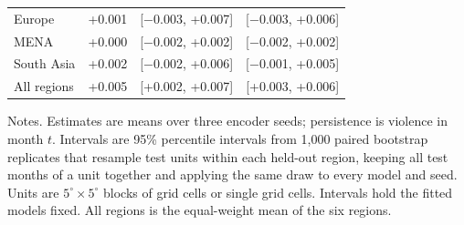 \begin{table}[!htbp]
\begin{tabular}{lccc}
Europe & +0.001 & [$-$0.003, +0.007] & [$-$0.003, +0.006] \\
MENA & +0.000 & [$-$0.002, +0.002] & [$-$0.002, +0.002] \\
South Asia & +0.002 & [$-$0.002, +0.006] & [$-$0.001, +0.005] \\
All regions & +0.005 & [+0.002, +0.007] & [+0.003, +0.006] \\
\hline
\end{tabular}
\begin{minipage}{0.92\textwidth}\footnotesize\vspace{0.5ex}
Notes. Estimates are means over three encoder seeds; persistence is violence in month $t$. Intervals are 95\% percentile intervals from 1,000 paired bootstrap replicates that resample test units within each held-out region, keeping all test months of a unit together and applying the same draw to every model and seed. Units are $5^\circ \times 5^\circ$ blocks of grid cells or single grid cells. Intervals hold the fitted models fixed. All regions is the equal-weight mean of the six regions.
\end{minipage}
\end{table}
